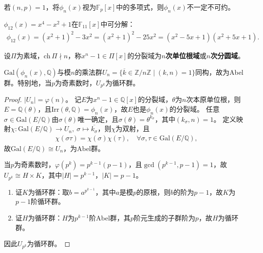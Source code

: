 \documentclass[../../main.tex]{subfiles}%
\begin{document}
\begin{remark}
若$(n,p)=1$，将$\phi_n(x)$视为$\mathbb{F}_p[x]$中的多项式，则$\phi_n(x)$不一定不可约。
\end{remark}

\begin{example}
$\phi_{12}(x)=x^4-x^2+1$在$\mathbb{F}_{11}[x]$中可分解：
\begin{align*}
\phi_{12}(x)=(x^2+1)^2-3x^2=(x^2+1)^2-25x^2=(x^2-5x+1)(x^2+5x+1).
\end{align*}
\end{example}

\begin{definition}
设$\Pi$为素域，$\mathrm{ch}\,\Pi\nmid n$，称$x^n-1\in\Pi[x]$的分裂域为\textbf{$n$次单位根域}或\textbf{$n$次分圆域}。
\end{definition}

\begin{theorem}
$\mathrm{Gal}(\phi_n(x),\mathbb{Q})$与模$n$的乘法群$U_n=\{\overline{k}\in\mathbb{Z}/n\mathbb{Z}\mid (k,n)=1\}$同构，故为Abel群。特别地，当$p$为奇素数时，$U_{p^k}$为循环群。
\end{theorem}
\begin{proof}

$|U_n|=\varphi(n)$。
记$E$为$x^n-1\in\mathbb{Q}[x]$的分裂域，$\theta$为$n$次本原单位根，则$E=\mathbb{Q}(\theta)$，且$\mathrm{Irr}(\theta,\mathbb{Q})=\phi_n(x)$，故$E$也是$\phi_n(x)$的分裂域。
任意$\sigma\in\mathrm{Gal}(E/\mathbb{Q})$由$\sigma(\theta)$唯一确定，且$\sigma(\theta)=\theta^{k_\sigma}$，其中$(k_\sigma,n)=1$。
定义映射$\chi:\mathrm{Gal}(E/\mathbb{Q})\to U_n,\ \sigma\mapsto \overline{k_\sigma}$，则$\chi$为双射，且
\begin{align*}
\chi(\sigma\tau)=\chi(\sigma)\chi(\tau),\quad \forall\sigma,\tau\in\mathrm{Gal}(E/\mathbb{Q}),
\end{align*}
故$\mathrm{Gal}(E/\mathbb{Q})\cong U_n$，为Abel群。

当$p$为奇素数时，$\varphi(p^k)=p^{k-1}(p-1)$，且$\gcd(p^{k-1},p-1)=1$，故$U_{p^k}\cong H\times K$，其中$|H|=p^{k-1}$，$|K|=p-1$。
\begin{enumerate}[(1)]
\item 证$K$为循环群：取$b=a^{p^{k-1}}$，其中$a$是模$p$的原根，则$b$的阶为$p-1$，故$K$为$p-1$阶循环群。
\item 证$H$为循环群：$H$为$p^{k-1}$阶Abel群，其$p$阶元生成的子群阶为$p$，故$H$为循环群。
\end{enumerate}
因此$U_{p^k}$为循环群。

\end{proof}
\end{document}
